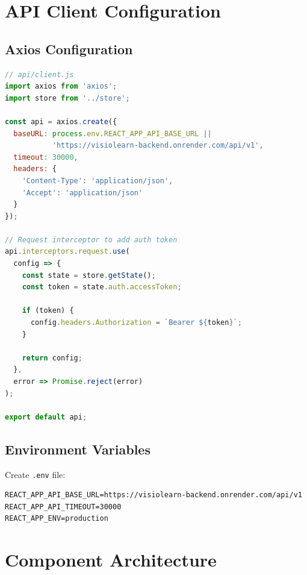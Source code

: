 \documentclass[12pt,a4paper,oneside]{article}
\begin{document}
\section{API Client Configuration}

\subsection{Axios Configuration}

\begin{lstlisting}[language=javascript]
// api/client.js
import axios from 'axios';
import store from '../store';

const api = axios.create({
  baseURL: process.env.REACT_APP_API_BASE_URL || 
           'https://visiolearn-backend.onrender.com/api/v1',
  timeout: 30000,
  headers: {
    'Content-Type': 'application/json',
    'Accept': 'application/json'
  }
});

// Request interceptor to add auth token
api.interceptors.request.use(
  config => {
    const state = store.getState();
    const token = state.auth.accessToken;
    
    if (token) {
      config.headers.Authorization = `Bearer ${token}`;
    }
    
    return config;
  },
  error => Promise.reject(error)
);

export default api;
\end{lstlisting}

\subsection{Environment Variables}

Create \texttt{.env} file:

\begin{lstlisting}
REACT_APP_API_BASE_URL=https://visiolearn-backend.onrender.com/api/v1
REACT_APP_API_TIMEOUT=30000
REACT_APP_ENV=production
\end{lstlisting}

\section{Component Architecture}
\end{document}

